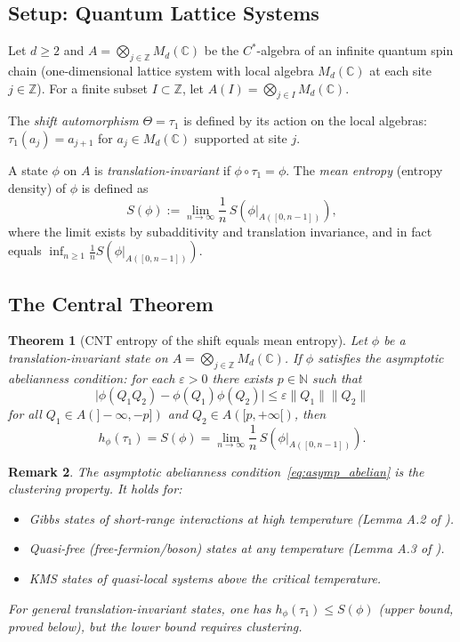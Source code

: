 \documentclass[12pt,a4paper]{article}
\newtheorem{theorem}{Theorem}[section]
\newtheorem{remark}[theorem]{Remark}
\newcommand{\CC}{\mathbb{C}}
\newcommand{\ZZ}{\mathbb{Z}}
\newcommand{\NN}{\mathbb{N}}
\newcommand{\Md}{M_d(\CC)}
\newcommand{\thetaaut}{\Theta}
\newcommand{\eps}{\varepsilon}
\newcommand{\norm}[1]{\lVert #1 \rVert}
\begin{document}
\subsection{Setup: Quantum Lattice Systems}

Let $d\ge 2$ and $A=\bigotimes_{j\in\ZZ}\Md$ be the $C^*$-algebra of an infinite
quantum spin chain (one-dimensional lattice system with local algebra $\Md$ at each
site $j\in\ZZ$).  For a finite subset $I\subset\ZZ$, let $A(I)=\bigotimes_{j\in I}\Md$.

The \emph{shift automorphism} $\thetaaut=\tau_1$ is defined by its action on the local
algebras: $\tau_1(a_j)=a_{j+1}$ for $a_j\in\Md$ supported at site $j$.

A state $\phi$ on $A$ is \emph{translation-invariant} if $\phi\circ\tau_1=\phi$.
The \emph{mean entropy} (entropy density) of $\phi$ is defined as
\begin{equation}\label{eq:mean_entropy}
  S(\phi) := \lim_{n\to\infty} \frac{1}{n}\,S(\phi|_{A([0,n-1])}),
\end{equation}
where the limit exists by subadditivity and translation invariance, and in fact equals
$\inf_{n\ge 1}\frac{1}{n}S(\phi|_{A([0,n-1])})$.

\subsection{The Central Theorem}

\begin{theorem}[CNT entropy of the shift equals mean entropy]\label{thm:cnt_shift}
Let $\phi$ be a translation-invariant state on $A=\bigotimes_{j\in\ZZ}\Md$.
If $\phi$ satisfies the \emph{asymptotic abelianness condition}: for each $\eps>0$
there exists $p\in\NN$ such that
\begin{equation}\label{eq:asymp_abelian}
  \bigl|\phi(Q_1 Q_2)-\phi(Q_1)\phi(Q_2)\bigr| \le \eps\norm{Q_1}\norm{Q_2}
\end{equation}
for all $Q_1\in A(]-\infty,-p])$ and $Q_2\in A([p,+\infty[)$,
then
\begin{equation}\label{eq:cnt_shift}
  h_\phi(\tau_1) = S(\phi) = \lim_{n\to\infty}\frac{1}{n}\,S(\phi|_{A([0,n-1])}).
\end{equation}
\end{theorem}

\begin{remark}
The asymptotic abelianness condition~\eqref{eq:asymp_abelian} is the \emph{clustering}
property.  It holds for:
\begin{itemize}
\item Gibbs states of short-range interactions at high temperature (Lemma A.2 of \cite{cnt87}).
\item Quasi-free (free-fermion/boson) states at any temperature (Lemma A.3 of \cite{cnt87}).
\item KMS states of quasi-local systems above the critical temperature.
\end{itemize}
For general translation-invariant states, one has $h_\phi(\tau_1)\le S(\phi)$
(upper bound, proved below), but the lower bound requires clustering.
\end{remark}
\end{document}
